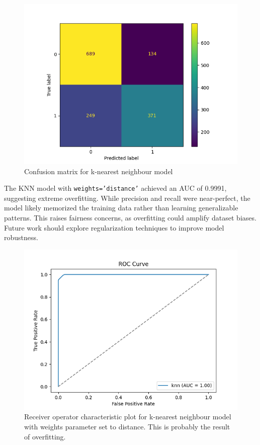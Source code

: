 \begin{figure}[H]
	\centering
	\includegraphics[width=0.7\linewidth]{img/knn_cm}
	\caption{Confusion matrix for k-nearest neighbour model}
	\label{fig:knncm}
\end{figure}



The KNN model with \texttt{weights='distance'} achieved an AUC of 0.9991, suggesting extreme overfitting. While precision and recall were near-perfect, the model likely memorized the training data rather than learning generalizable patterns. This raises fairness concerns, as overfitting could amplify dataset biases. Future work should explore regularization techniques to improve model robustness.

\begin{figure}[H]
	\centering
	\includegraphics[width=0.7\linewidth]{img/knn_roc_distance}
	\caption{Receiver operator characteristic plot for k-nearest neighbour model with weights parameter set to distance. This is probably the result of overfitting.}
	\label{fig:knnrocdistance}
\end{figure}


